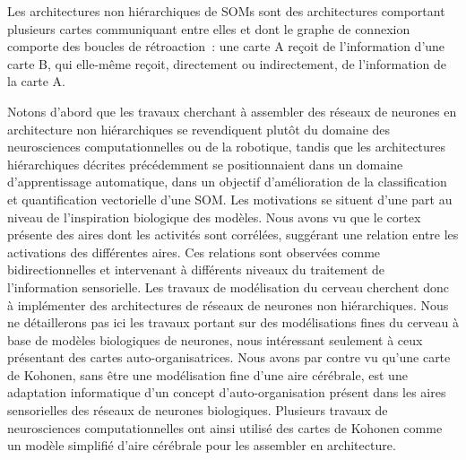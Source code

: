 \documentclass[../main]{subfiles}
\begin{document}
Les architectures non hiérarchiques de SOMs sont des architectures comportant plusieurs cartes communiquant entre elles et dont le graphe de connexion comporte des boucles de rétroaction~: une carte A reçoit de l'information d'une carte B, qui elle-même reçoit, directement ou indirectement, de l'information de la carte A.

Notons d'abord que les travaux cherchant à assembler des réseaux de neurones en architecture non hiérarchiques se revendiquent plutôt du domaine des neurosciences computationnelles ou de la robotique, tandis que les architectures hiérarchiques décrites précédemment se positionnaient dans un domaine d'apprentissage automatique, dans un objectif d'amélioration de la classification et quantification vectorielle d'une SOM.
Les motivations se situent d'une part au niveau de l'inspiration biologique des modèles. 
Nous avons vu que le cortex présente des aires dont les activités sont corrélées, suggérant une relation entre les activations des différentes aires. Ces relations sont observées comme bidirectionnelles et intervenant à différents niveaux du traitement de l'information sensorielle.
Les travaux de modélisation du cerveau cherchent donc à implémenter des architectures de réseaux de neurones non hiérarchiques. 
Nous ne détaillerons pas ici les travaux portant sur des modélisations fines du cerveau à base de modèles biologiques de neurones, nous intéressant seulement à ceux présentant des cartes auto-organisatrices.
Nous avons par contre vu qu'une carte de Kohonen, sans être une modélisation fine d'une aire cérébrale, est une adaptation informatique d'un concept d'auto-organisation présent dans les aires sensorielles des réseaux de neurones biologiques. Plusieurs travaux de neurosciences computationnelles ont ainsi utilisé des cartes de Kohonen comme un modèle simplifié d'aire cérébrale pour les assembler en architecture.
\end{document}
